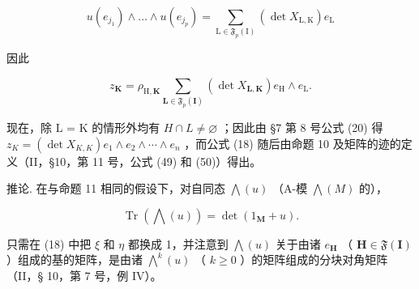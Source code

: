 \[
u (e _ {j _ {1}}) \wedge \dots \wedge u (e _ {j _ {p}}) = \sum_ {\mathrm{L} \in \mathfrak {F} _ {p} (\mathrm{I})} (\det X _ {\mathrm{L}, \mathrm{K}}) e _ {\mathrm{L}}
\]

因此

\[
z _ {\mathbf {K}} = \rho_ {\mathrm{H}, \mathbf {K}} \sum_ {\mathbf {L} \in \mathfrak {F} _ {p} (\mathbf {I})} (\det X _ {\mathbf {L}, \mathbf {K}}) e _ {\mathrm{H}} \wedge e _ {\mathrm{L}}.
\]

现在，除 L = K 的情形外均有 \(H \cap L \neq \varnothing\) ；因此由 §7 第 8 号公式 (20) 得 \(z_{K} = (\det X_{K,K})e_{1} \wedge e_{2} \wedge \cdots \wedge e_{n}\) ，而公式 (18) 随后由命题 10 及矩阵的迹的定义（II，§10，第 11 号，公式 (49) 和 (50)）得出。

推论. 在与命题 11 相同的假设下，对自同态 \(\bigwedge(u)\) （A-模 \(\bigwedge(M)\) 的），

\[
\operatorname{Tr} (\bigwedge (u)) = \det (1 _ {\mathbf {M}} + u).\tag{19}
\]

只需在 (18) 中把 \(\xi\) 和 \(\eta\) 都换成 1，并注意到 \(\bigwedge(u)\) 关于由诸 \(e_{\mathbf{H}}\) （ \(\mathbf{H} \in \mathfrak{F}(\mathbf{I})\) ）组成的基的矩阵，是由诸 \(\bigwedge^{k}(u)\) （ \(k \geqslant 0\) ）的矩阵组成的分块对角矩阵（II，§ 10，第 7 号，例 IV）。


